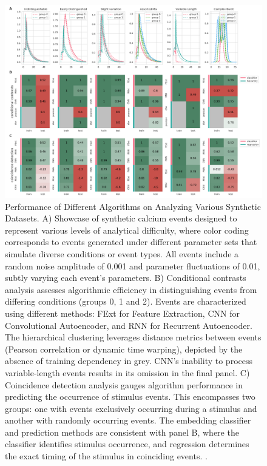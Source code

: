 \begin{figure}[!htb]
\begin{center}
\includegraphics[width=\linewidth]{figures/6.png}
\end{center}
\caption{
Performance of Different Algorithms on Analyzing Various Synthetic Datasets. A) Showcase of synthetic calcium events designed to represent various levels of analytical difficulty, where color coding corresponds to events generated under different parameter sets that simulate diverse conditions or event types. All events include a random noise amplitude of 0.001 and parameter fluctuations of 0.01, subtly varying each event's parameters. B) Conditional contrasts analysis assesses algorithmic efficiency in distinguishing events from differing conditions (groups 0, 1 and 2). Events are characterized using different methods: FExt for Feature Extraction, CNN for Convolutional Autoencoder, and RNN for Recurrent Autoencoder. The hierarchical clustering leverages distance metrics between events (Pearson correlation or dynamic time warping), depicted by the absence of training dependency in grey. CNN's inability to process variable-length events results in its omission in the final panel. C) Coincidence detection analysis gauges algorithm performance in predicting the occurrence of stimulus events. This encompasses two groups: one with events exclusively occurring during a stimulus and another with randomly occurring events. The embedding classifier and prediction methods are consistent with panel B, where the classifier identifies stimulus occurrence, and regression determines the exact timing of the stimulus in coinciding events. .
}\label{fig:6}
\end{figure}

